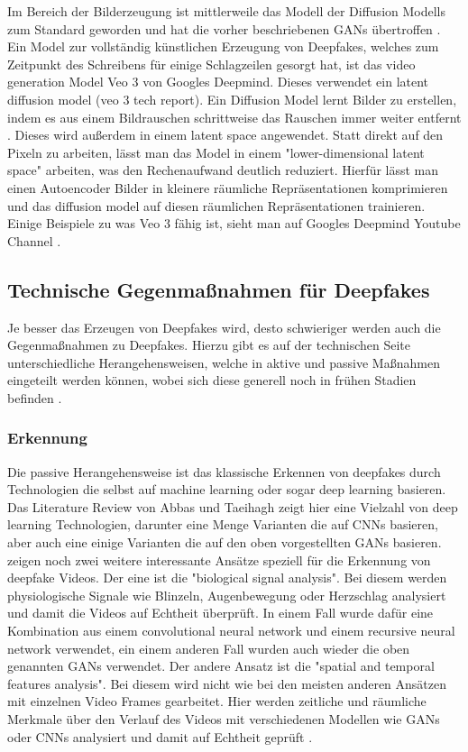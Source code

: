 Im Bereich der Bilderzeugung ist mittlerweile das Modell der Diffusion Modells zum Standard geworden \cite{guptaPhotorealisticVideoGeneration} 
und hat die vorher beschriebenen GANs übertroffen \cite{williampeeblesScalableDiffusionModels}. 
Ein Model zur vollständig künstlichen Erzeugung von Deepfakes, welches zum Zeitpunkt des Schreibens für einige Schlagzeilen \cite{proschofskyGooglesNeueVideoKI2025} gesorgt hat, 
ist das video generation Model Veo 3 von Googles Deepmind. Dieses verwendet ein latent diffusion model (veo 3 tech report). 
Ein Diffusion Model lernt Bilder zu erstellen, indem es aus einem Bildrauschen schrittweise das Rauschen immer weiter entfernt \cite{guptaPhotorealisticVideoGeneration}. 
Dieses wird außerdem in einem latent space angewendet. Statt direkt auf den Pixeln zu arbeiten, 
lässt man das Model in einem "lower-dimensional latent space" \cite{guptaPhotorealisticVideoGeneration} arbeiten, was den Rechenaufwand deutlich reduziert. 
Hierfür lässt man einen Autoencoder Bilder in kleinere räumliche Repräsentationen komprimieren und das diffusion model auf diesen räumlichen Repräsentationen trainieren. 
Einige Beispiele zu was Veo 3 fähig ist, sieht man auf Googles Deepmind Youtube Channel \cite{Veo3Our}.

\subsection{Technische Gegenmaßnahmen für Deepfakes}
Je besser das Erzeugen von Deepfakes wird, desto schwieriger werden auch die Gegenmaßnahmen zu Deepfakes. 
Hierzu gibt es auf der technischen Seite unterschiedliche Herangehensweisen, welche in aktive und passive Maßnahmen eingeteilt werden können, 
wobei sich diese generell noch in frühen Stadien befinden \cite{abbasUnmaskingDeepfakesSystematic2024}.
\subsubsection{Erkennung}
Die passive Herangehensweise ist das klassische Erkennen von deepfakes durch Technologien die selbst auf machine learning oder sogar deep learning basieren. 
Das Literature Review von Abbas und Taeihagh zeigt hier eine Vielzahl von deep learning Technologien, 
darunter eine Menge Varianten die auf CNNs basieren, aber auch eine einige Varianten die auf den oben vorgestellten GANs basieren. 
\textcite{benaissaOverviewGANDeepFakesDetection2024} zeigen noch zwei weitere interessante Ansätze speziell für die Erkennung von deepfake Videos. 
Der eine ist die "biological signal analysis". Bei diesem werden physiologische Signale wie Blinzeln, Augenbewegung oder Herzschlag analysiert und damit die Videos auf Echtheit überprüft. 
In einem Fall wurde dafür eine Kombination aus einem convolutional neural network und einem recursive neural network verwendet, 
ein einem anderen Fall wurden auch wieder die oben genannten GANs verwendet.
Der andere Ansatz ist die "spatial and temporal features analysis". Bei diesem wird nicht wie bei den meisten anderen Ansätzen mit einzelnen Video Frames gearbeitet. 
Hier werden zeitliche und räumliche Merkmale über den Verlauf des Videos mit verschiedenen Modellen wie GANs oder CNNs analysiert und damit auf Echtheit geprüft \cite{benaissaOverviewGANDeepFakesDetection2024}.

